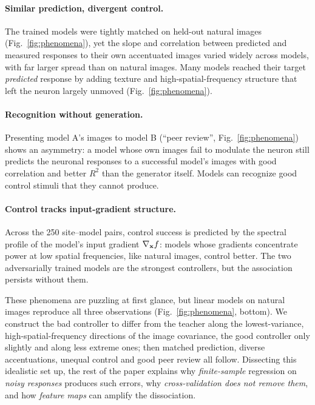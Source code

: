 \paragraph{Similar prediction, divergent control.}
The trained models were tightly matched on held-out natural images (Fig.~\ref{fig:phenomena}), yet the slope and correlation between predicted and measured responses to their own accentuated images varied widely across models, with far larger spread than on natural images. Many models reached their target \emph{predicted} response by adding texture and high-spatial-frequency structure that left the neuron largely unmoved (Fig.~\ref{fig:phenomena}).

\paragraph{Recognition without generation.}
Presenting model A's images to model B (``peer review'', Fig.~\ref{fig:phenomena}) shows an asymmetry: a model whose own images fail to modulate the neuron still predicts the neuronal responses to a successful model's images with good correlation and better $R^2$ than the generator itself. Models can recognize good control stimuli that they cannot produce.

\paragraph{Control tracks input-gradient structure.}
Across the 250 site--model pairs, control success is predicted by the spectral profile of the model's input gradient $\nabla_{\mathbf{x}} f$: models whose gradients concentrate power at low spatial frequencies, like natural images, control better. The two adversarially trained models are the strongest controllers, but the association persists without them.

These phenomena are puzzling at first glance, but linear models on natural images reproduce all three observations (Fig.~\ref{fig:phenomena}, bottom). We construct the bad controller to differ from the teacher along the lowest-variance, high-spatial-frequency directions of the image covariance, the good controller only slightly and along less extreme ones; then matched prediction, diverse accentuations, unequal control and good peer review all follow. Dissecting this idealistic set up, the rest of the paper explains why \textit{finite-sample} regression on \textit{noisy responses} produces such errors, why \textit{cross-validation does not remove them}, and how \textit{feature maps} can amplify the dissociation.

